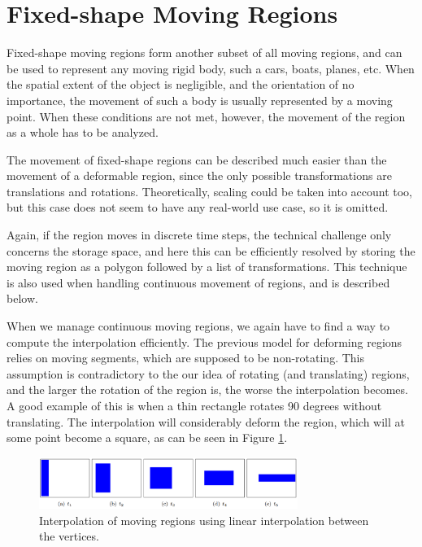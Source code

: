 \section{Fixed-shape Moving Regions}
\label{section:fixed_shape_regions}

Fixed-shape moving regions form another subset of all moving regions, and can be used to represent any moving rigid body, such a cars, boats, planes, etc. When the spatial extent of the object is negligible, and the orientation of no importance, the movement of such a body is usually represented by a moving point. When these conditions are not met, however, the movement of the region as a whole has to be analyzed.

The movement of fixed-shape regions can be described much easier than the movement of a deformable region, since the only possible transformations are translations and rotations. Theoretically, scaling could be taken into account too, but this case does not seem to have any real-world use case, so it is omitted.

Again, if the region moves in discrete time steps, the technical challenge only concerns the storage space, and here this can be efficiently resolved by storing the moving region as a polygon followed by a list of transformations. This technique is also used when handling continuous movement of regions, and is described below.

When we manage continuous moving regions, we again have to find a way to compute the interpolation efficiently. The previous model for deforming regions relies on moving segments, which are supposed to be non-rotating. This assumption is contradictory to the our idea of rotating (and translating) regions, and the larger the rotation of the region is, the worse the interpolation becomes. A good example of this is when a thin rectangle rotates 90 degrees without translating. The interpolation will considerably deform the region, which will at some point become a square, as can be seen in Figure \ref{fig:vertices_interpolation}.

\begin{figure}[h!]
    \centering
    \includegraphics[width=0.75\textwidth]{images/vertices_interpolation.png}
    \caption{Interpolation of moving regions using linear interpolation between the vertices. \cite{fmregion}}
    \label{fig:vertices_interpolation}
\end{figure}


